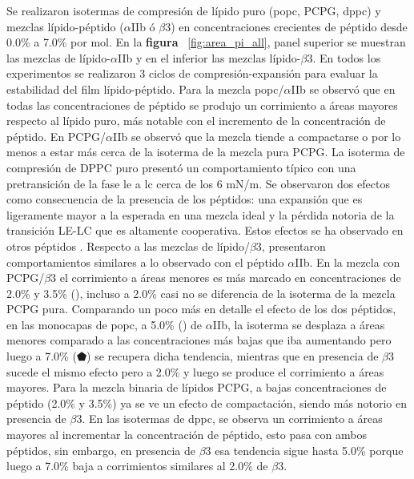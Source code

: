 Se realizaron isotermas de compresión de lípido puro (\ac{popc}, PCPG, \ac{dppc}) y mezclas lípido-péptido ($\alpha$IIb ó $\beta$3) en concentraciones crecientes de péptido desde 0.0\% a 7.0\% por mol. En la \textbf{figura} ~\ref{fig:area_pi_all}, panel superior se muestran las mezclas de lípido-$\alpha$IIb y en el inferior las mezclas lípido-$\beta$3. En todos los experimentos se realizaron 3 ciclos de compresión-expansión para evaluar la estabilidad del film lípido-péptido. Para la mezcla  \ac{popc}/$\alpha$IIb se observó que en todas las concentraciones de péptido se produjo un corrimiento a áreas mayores respecto al lípido puro, más notable con el incremento de la concentración de péptido. En PCPG/$\alpha$IIb se observó que la mezcla tiende a compactarse o por lo menos a estar más cerca de la isoterma de la mezcla pura PCPG. La isoterma de compresión de DPPC puro presentó un comportamiento típico con una pretransición de la fase \ac{le} a \ac{lc} cerca de los 6 mN/m. Se observaron dos efectos como consecuencia de la presencia de los péptidos: una expansión que es ligeramente mayor a la esperada en una mezcla ideal y la pérdida notoria de la transición LE-LC que es altamente cooperativa. Estos efectos se ha observado en otros péptidos \citep{Saleem2008, Nakahara2011}.
Respecto a las mezclas de lípido/$\beta$3, presentaron comportamientos similares a lo observado con el péptido $\alpha$IIb. En la mezcla con PCPG/$\beta$3 el corrimiento a áreas menores es más marcado en concentraciones de 2.0\% y 3.5\% (\textcolor{falured}{}), incluso a 2.0\% casi no se diferencia de la isoterma de la mezcla PCPG pura.
Comparando un poco más en detalle el efecto de los dos péptidos, en las monocapas de \ac{popc}, a 5.0\% (\textcolor{goldenpoppy}{\faCircle}) de $\alpha$IIb, la isoterma se desplaza a áreas menores comparado a las concentraciones más bajas que iba aumentando pero luego a 7.0\% (\textcolor{deepmagenta}{$\pentagonblack$}) se recupera dicha tendencia, mientras que en presencia de $\beta$3 sucede el mismo efecto pero a 2.0\% y luego se produce el corrimiento a áreas mayores. Para la mezcla binaria de lípidos PCPG, a bajas concentraciones de péptido (2.0\% y 3.5\%) ya se ve un efecto de compactación, siendo más notorio en presencia de $\beta$3. En las isotermas de \ac{dppc}, se observa un corrimiento a áreas mayores al incrementar la concentración de péptido, esto pasa con ambos péptidos, sin embargo, en presencia de $\beta$3 esa tendencia sigue hasta 5.0\% porque luego a 7.0\% baja a corrimientos similares al 2.0\% de $\beta$3.

